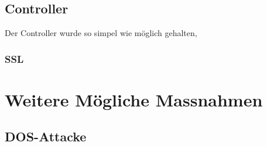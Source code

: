 \documentclass[10pt]{scrartcl}
\begin{document}
\subsection{Controller}
Der Controller wurde so simpel wie möglich gehalten, 

\subsubsection{SSL}

\section{Weitere Mögliche Massnahmen}

\subsection{DOS-Attacke}

 
\end{document}
